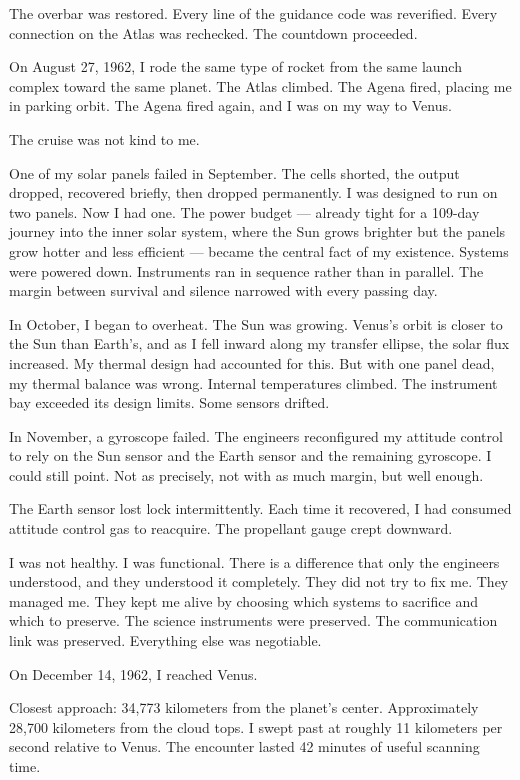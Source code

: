 \documentclass[12pt,letterpaper]{article}
\begin{document}
The overbar was restored. Every line of the guidance code was reverified. Every connection on the Atlas was rechecked. The countdown proceeded.

On August 27, 1962, I rode the same type of rocket from the same launch complex toward the same planet. The Atlas climbed. The Agena fired, placing me in parking orbit. The Agena fired again, and I was on my way to Venus.

\bigskip

The cruise was not kind to me.

One of my solar panels failed in September. The cells shorted, the output dropped, recovered briefly, then dropped permanently. I was designed to run on two panels. Now I had one. The power budget --- already tight for a 109-day journey into the inner solar system, where the Sun grows brighter but the panels grow hotter and less efficient --- became the central fact of my existence. Systems were powered down. Instruments ran in sequence rather than in parallel. The margin between survival and silence narrowed with every passing day.

In October, I began to overheat. The Sun was growing. Venus's orbit is closer to the Sun than Earth's, and as I fell inward along my transfer ellipse, the solar flux increased. My thermal design had accounted for this. But with one panel dead, my thermal balance was wrong. Internal temperatures climbed. The instrument bay exceeded its design limits. Some sensors drifted.

In November, a gyroscope failed. The engineers reconfigured my attitude control to rely on the Sun sensor and the Earth sensor and the remaining gyroscope. I could still point. Not as precisely, not with as much margin, but well enough.

The Earth sensor lost lock intermittently. Each time it recovered, I had consumed attitude control gas to reacquire. The propellant gauge crept downward.

I was not healthy. I was functional. There is a difference that only the engineers understood, and they understood it completely. They did not try to fix me. They managed me. They kept me alive by choosing which systems to sacrifice and which to preserve. The science instruments were preserved. The communication link was preserved. Everything else was negotiable.

\bigskip

On December 14, 1962, I reached Venus.

Closest approach: 34,773 kilometers from the planet's center. Approximately 28,700 kilometers from the cloud tops. I swept past at roughly 11 kilometers per second relative to Venus. The encounter lasted 42 minutes of useful scanning time.
\end{document}
